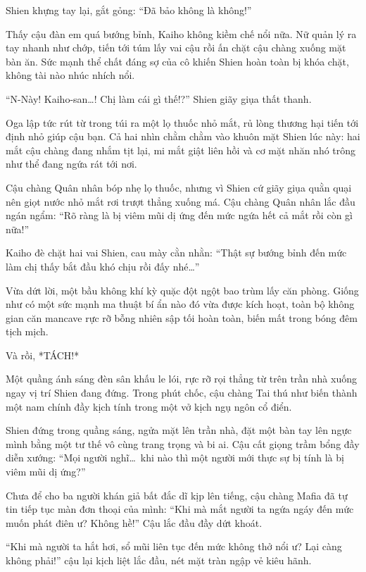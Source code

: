 \documentclass[../main.tex]{subfiles}
\begin{document}

Shien khựng tay lại, gắt gỏng: ``Đã bảo không là không!''

Thấy cậu đàn em quá bướng bỉnh, Kaiho không kiềm chế nổi nữa. Nữ quản lý ra tay nhanh như chớp, tiến tới túm lấy vai cậu rồi ấn chặt cậu chàng xuống mặt bàn ăn. Sức mạnh thể chất đáng sợ của cô khiến Shien hoàn toàn bị khóa chặt, không tài nào nhúc nhích nổi.

``N-Này! Kaiho-san\dots! Chị làm cái gì thế!?'' Shien giãy giụa thất thanh.

Oga lập tức rút từ trong túi ra một lọ thuốc nhỏ mắt, rủ lòng thương hại tiến tới định nhỏ giúp cậu bạn. Cả hai nhìn chằm chằm vào khuôn mặt Shien lúc này: hai mắt cậu chàng đang nhắm tịt lại, mi mắt giật liên hồi và cơ mặt nhăn nhó trông như thể đang ngứa rát tới nơi.

Cậu chàng Quân nhân bóp nhẹ lọ thuốc, nhưng vì Shien cứ giãy giụa quằn quại nên giọt nước nhỏ mắt rơi trượt thẳng xuống má. Cậu chàng Quân nhân lắc đầu ngán ngẩm: ``Rõ ràng là bị viêm mũi dị ứng đến mức ngứa hết cả mắt rồi còn gì nữa!''


Kaiho đè chặt hai vai Shien, cau mày cằn nhằn: ``Thật sự bướng bỉnh đến mức làm chị thấy bắt đầu khó chịu rồi đấy nhé\dots''

Vừa dứt lời, một bầu không khí kỳ quặc đột ngột bao trùm lấy căn phòng. Giống như có một sức mạnh ma thuật bí ẩn nào đó vừa được kích hoạt, toàn bộ không gian căn mancave rực rỡ bỗng nhiên sập tối hoàn toàn, biến mất trong bóng đêm tịch mịch.

Và rồi, *TÁCH!*

Một quầng ánh sáng đèn sân khấu le lói, rực rỡ rọi thẳng từ trên trần nhà xuống ngay vị trí Shien đang đứng. Trong phút chốc, cậu chàng Tai thú như biến thành một nam chính đầy kịch tính trong một vở kịch ngụ ngôn cổ điển.


Shien đứng trong quầng sáng, ngửa mặt lên trần nhà, đặt một bàn tay lên ngực mình bằng một tư thế vô cùng trang trọng và bi ai. Cậu cất giọng trầm bổng đầy diễn xướng: ``Mọi người nghĩ\dots\ khi nào thì một người mới thực sự bị tính là bị viêm mũi dị ứng?''

Chưa để cho ba người khán giả bất đắc dĩ kịp lên tiếng, cậu chàng Mafia đã tự tin tiếp tục màn đơn thoại của mình: ``Khi mà mắt người ta ngứa ngáy đến mức muốn phát điên ư? Không hề!'' Cậu lắc đầu đầy dứt khoát.

``Khi mà người ta hắt hơi, sổ mũi liên tục đến mức không thở nổi ư? Lại càng không phải!'' cậu lại kịch liệt lắc đầu, nét mặt tràn ngập vẻ kiêu hãnh.
\end{document}
